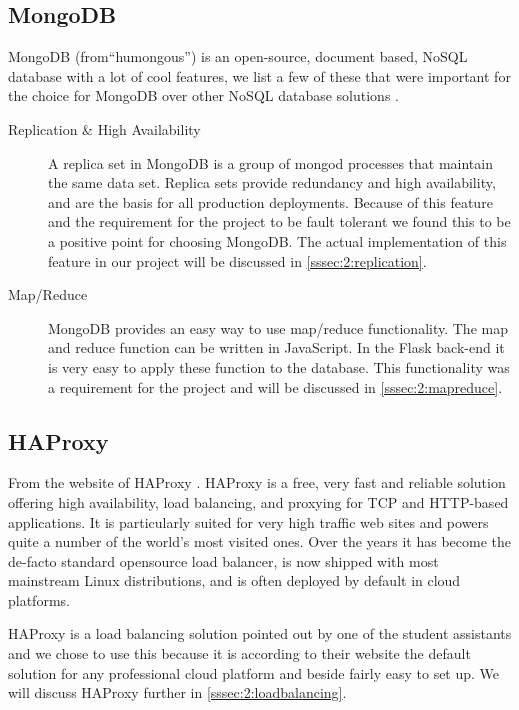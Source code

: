 \subsection{MongoDB}
\label{ssec:2:mongodb}
MongoDB (from``humongous'') is an open-source, document based, NoSQL database with a lot of cool features, we list a few of these that were important for the choice for MongoDB over other NoSQL database solutions \cite{mongo-db}.

\begin{description}
\item[Replication \& High Availability] A replica set in MongoDB is a group of mongod processes that maintain the same data set. Replica sets provide redundancy and high availability, and are the basis for all production deployments. Because of this feature and the requirement for the project to be fault tolerant we found this to be a positive point for choosing MongoDB. The actual implementation of this feature in our project will be discussed in \autoref{sssec:2:replication}.

\item[Map/Reduce] MongoDB provides an easy way to use map/reduce functionality. The map and reduce function can be written in JavaScript. In the Flask back-end it is very easy to apply these function to the database. This functionality was a requirement for the project and will be discussed in \autoref{sssec:2:mapreduce}.
\end{description}

\subsection{HAProxy}
\label{ssec:2:haproxy}
From the website of HAProxy \cite{ha-proxy}. HAProxy is a free, very fast and reliable solution offering high availability, load balancing, and proxying for TCP and HTTP-based applications. It is particularly suited for very high traffic web sites and powers quite a number of the world's most visited ones. Over the years it has become the de-facto standard opensource load balancer, is now shipped with most mainstream Linux distributions, and is often deployed by default in cloud platforms.

HAProxy is a load balancing solution pointed out by one of the student assistants and we chose to use this because it is according to their website the default solution for any professional cloud platform and beside fairly easy to set up. We will discuss HAProxy further in \autoref{sssec:2:loadbalancing}.

